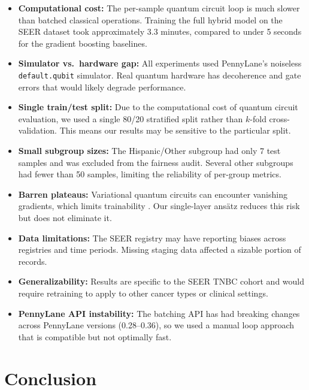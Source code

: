 \documentclass[12pt, letterpaper]{article}
\begin{document}
\begin{itemize}
    \item \textbf{Computational cost:} The per-sample quantum circuit loop is much slower than batched classical operations. Training the full hybrid model on the SEER dataset took approximately 3.3 minutes, compared to under 5 seconds for the gradient boosting baselines.
    \item \textbf{Simulator vs.\ hardware gap:} All experiments used PennyLane's noiseless \texttt{default.qubit} simulator. Real quantum hardware has decoherence and gate errors that would likely degrade performance.
    \item \textbf{Single train/test split:} Due to the computational cost of quantum circuit evaluation, we used a single 80/20 stratified split rather than $k$-fold cross-validation. This means our results may be sensitive to the particular split.
    \item \textbf{Small subgroup sizes:} The Hispanic/Other subgroup had only 7 test samples and was excluded from the fairness audit. Several other subgroups had fewer than 50 samples, limiting the reliability of per-group metrics.
    \item \textbf{Barren plateaus:} Variational quantum circuits can encounter vanishing gradients, which limits trainability \citep{mcclean2018}. Our single-layer ans\"{a}tz reduces this risk but does not eliminate it.
    \item \textbf{Data limitations:} The SEER registry may have reporting biases across registries and time periods. Missing staging data affected a sizable portion of records.
    \item \textbf{Generalizability:} Results are specific to the SEER TNBC cohort and would require retraining to apply to other cancer types or clinical settings.
    \item \textbf{PennyLane API instability:} The batching API has had breaking changes across PennyLane versions (0.28--0.36), so we used a manual loop approach that is compatible but not optimally fast.
\end{itemize}


\section{Conclusion}
\end{document}
